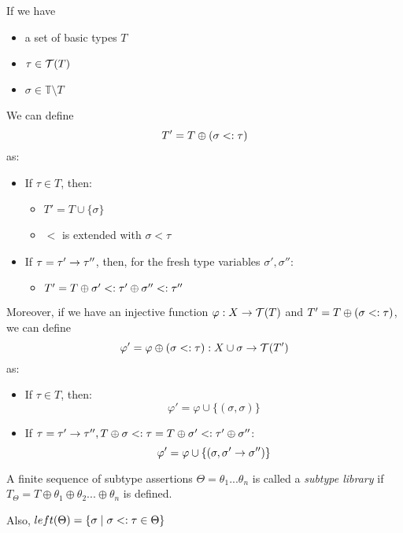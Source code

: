 \documentclass[main.tex]{subfiles}
\begin{document}
\begin{defn}
    If we have
    \begin{itemize}
        \item a set of basic types $T$
        \item $\tau \in \mathcal{T}( T )$
        \item $\sigma \in \mathbb{T} \setminus T$
    \end{itemize}
    We can define \[ T' = T \oplus (\sigma <: \tau) \] as:
    \begin{itemize}
        \item If $\tau \in T$, then:
            \begin{itemize}
                \item $T' = T \cup \{ \sigma \}$
                \item $\less$ is extended with $\sigma \less \tau$
            \end{itemize}
        \item If $\tau = \tau' \rightarrow \tau''$, then, for the fresh type variables $\sigma', \sigma''$:
            \begin{itemize}
                \item $T' = T \oplus \sigma' <: \tau' \oplus \sigma'' <: \tau''$
            \end{itemize}
    \end{itemize}

    Moreover, if we have an injective function $\varphi : X \rightarrow \mathcal{T}( T )$ and
    $T' = T \oplus (\sigma <: \tau)$, we can define
    \[\varphi' = \varphi \oplus (\sigma <: \tau) : X \cup \sigma \rightarrow \mathcal{T}( T' )\]
    as:
    \begin{itemize}
        \item If $\tau \in T$, then:
            \[ \varphi' = \varphi \cup \{ (\sigma, \sigma) \} \]
        \item If $\tau = \tau' \rightarrow \tau'', T \oplus \sigma <: \tau
            = T \oplus \sigma' <: \tau' \oplus \sigma''$:
            \[ \varphi' = \varphi \cup \{ (\sigma, \sigma' \rightarrow \sigma'') \} \]
    \end{itemize}
\end{defn}

\begin{defn}
    A finite sequence of subtype assertions
    $\Theta = \theta_1 ... \theta_n$ is called a \emph{subtype library}
    if $T_{\Theta} = T \oplus \theta_1 \oplus \theta_2 ... \oplus \theta_n$ is defined.

    Also, $left(\Theta) = \{ \sigma \mid \sigma <: \tau \in \Theta \}$
\end{defn}
\end{document}
